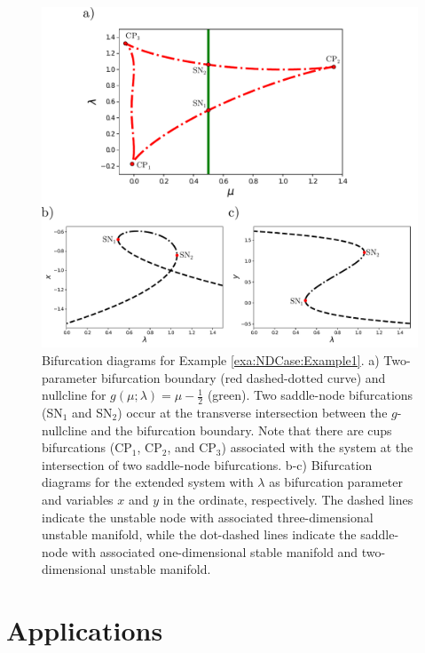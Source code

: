 \documentclass[12pt]{article}
\begin{document}
\begin{figure}
    \begin{center}
        \includegraphics[width=\linewidth]{figures/Example3.pdf}
    \end{center}
    \caption[Bifurcation diagrams for Example \ref{exa:NDCase:Example1}.]{Bifurcation diagrams for Example \ref{exa:NDCase:Example1}. a) Two-parameter bifurcation boundary (red dashed-dotted curve) and nullcline for $g(\mu;\lambda)=\mu-\tfrac{1}{2}$ (green). Two saddle-node bifurcations (SN$_{1}$ and SN$_{2}$) occur at the transverse intersection between the $g$-nullcline and the bifurcation boundary. Note that there are cups bifurcations (CP$_{1}$, CP$_{2}$, and CP$_{3}$) associated with the system at the intersection of two saddle-node bifurcations. b-c) Bifurcation diagrams for the extended system with $\lambda$ as bifurcation parameter and variables $x$ and $y$ in the ordinate, respectively. The dashed lines indicate the unstable node with associated three-dimensional unstable manifold, while the dot-dashed lines indicate the saddle-node with associated one-dimensional stable manifold and two-dimensional unstable manifold.}
    \label{fig:1DCase:Example3}
\end{figure}


\section{Applications}
\end{document}
